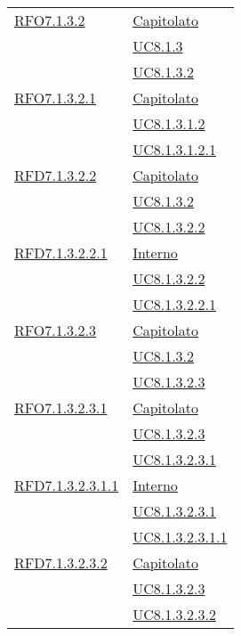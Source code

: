 \begin{longtable}{|>{\centering}m{5cm}|m{5cm}<{\centering}|}
\hyperlink{RFO7.1.3.2}{RFO7.1.3.2} & \hyperlink{Capitolato}{Capitolato}\\
& \hyperref[UC8.1.3]{UC8.1.3}\\
& \hyperref[UC8.1.3.2]{UC8.1.3.2}\\ \hline

\hyperlink{RFO7.1.3.2.1}{RFO7.1.3.2.1} & \hyperlink{Capitolato}{Capitolato}\\
& \hyperref[UC8.1.3.1.2]{UC8.1.3.1.2}\\
& \hyperref[UC8.1.3.1.2.1]{UC8.1.3.1.2.1}\\ \hline

\hyperlink{RFD7.1.3.2.2}{RFD7.1.3.2.2} & \hyperlink{Capitolato}{Capitolato}\\
& \hyperref[UC8.1.3.2]{UC8.1.3.2}\\
& \hyperref[UC8.1.3.2.2]{UC8.1.3.2.2}\\ \hline

\hyperlink{RFD7.1.3.2.2.1}{RFD7.1.3.2.2.1} & \hyperlink{Interno}{Interno}\\
& \hyperref[UC8.1.3.2.2]{UC8.1.3.2.2}\\
& \hyperref[UC8.1.3.2.2.1]{UC8.1.3.2.2.1}\\ \hline

\hyperlink{RFO7.1.3.2.3}{RFO7.1.3.2.3} & \hyperlink{Capitolato}{Capitolato}\\
& \hyperref[UC8.1.3.2]{UC8.1.3.2}\\
& \hyperref[UC8.1.3.2.3]{UC8.1.3.2.3}\\ \hline

\hyperlink{RFO7.1.3.2.3.1}{RFO7.1.3.2.3.1} & \hyperlink{Capitolato}{Capitolato}\\
& \hyperref[UC8.1.3.2.3]{UC8.1.3.2.3}\\
& \hyperref[UC8.1.3.2.3.1]{UC8.1.3.2.3.1}\\ \hline

\hyperlink{RFD7.1.3.2.3.1.1}{RFD7.1.3.2.3.1.1} & \hyperlink{Interno}{Interno}\\
& \hyperref[UC8.1.3.2.3.1]{UC8.1.3.2.3.1}\\
& \hyperref[UC8.1.3.2.3.1.1]{UC8.1.3.2.3.1.1}\\ \hline

\hyperlink{RFD7.1.3.2.3.2}{RFD7.1.3.2.3.2} & \hyperlink{Capitolato}{Capitolato}\\
& \hyperref[UC8.1.3.2.3]{UC8.1.3.2.3}\\
& \hyperref[UC8.1.3.2.3.2]{UC8.1.3.2.3.2}\\ \hline


\end{longtable}

